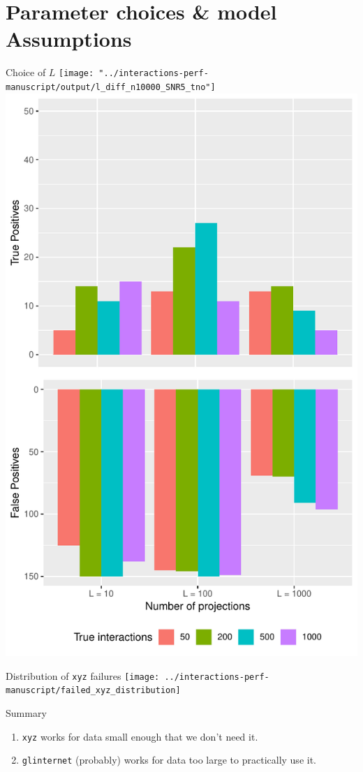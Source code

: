 \section{Parameter choices \& model Assumptions}
\begin{frame}{Choice of $L$}
\centering
\texttt{[image: "../interactions-perf-manuscript/output/l\_diff\_n10000\_SNR5\_tno"]}%
\includegraphics[width=0.45\linewidth]{"output/quant_analysis_n10000"}
\end{frame}

\begin{frame}{Distribution of \texttt{xyz} failures}
\centering
\texttt{[image: ../interactions-perf-manuscript/failed\_xyz\_distribution]}
\end{frame}

\begin{frame}{Summary}
\begin{enumerate}
	\item \texttt{xyz} works for data small enough that we don't need it.
	\item \texttt{glinternet} (probably) works for data too large to practically use it.
\end{enumerate}
\end{frame}





